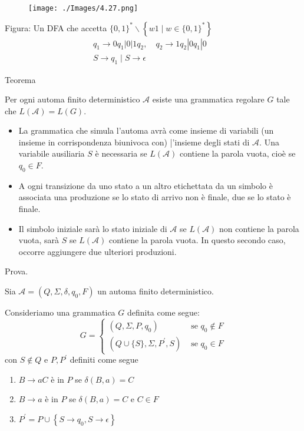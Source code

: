 \begin{figure}[hbpt!]
    \centering
    \texttt{[image: ./Images/4.27.png]}
\end{figure}
\FloatBarrier

Figura: Un DFA che accetta $\{0,1\}^{*} \backslash\left\{w 1 \mid w \in\{0,1\}^{*}\right\}$
$$
\begin{aligned}
q_{1} \rightarrow 0 q_{1}|0| 1 q_{2}, \quad q_{2} \rightarrow 1 q_{2}\left|0 q_{1}\right| 0 & \\
S \rightarrow q_{1} \mid S \rightarrow \epsilon &
\end{aligned}
$$

Teorema

Per ogni automa finito deterministico $\mathcal{A}$ esiste una grammatica regolare $G$ tale che $L(\mathcal{A})=L(G)$.
\begin{itemize}
    \item  La grammatica che simula l'automa avrà come insieme di variabili (un insieme in corrispondenza biunivoca con) |'insieme degli stati di $\mathcal{A}$. Una variabile ausiliaria $S$ è necessaria se $L(\mathcal{A})$ contiene la parola vuota, cioè se $q_{0} \in F$.
    \item A ogni transizione da uno stato a un altro etichettata da un simbolo è associata una produzione se lo stato di arrivo non è finale, due se lo stato è finale.
    \item Il simbolo iniziale sarà lo stato iniziale di $\mathcal{A}$ se $L(\mathcal{A})$ non contiene la parola vuota, sarà $S$ se $L(\mathcal{A})$ contiene la parola vuota. In questo secondo caso, occorre aggiungere due ulteriori produzioni.
\end{itemize}

Prova. 

Sia $\mathcal{A}=\left(Q, \Sigma, \delta, q_{0}, F\right)$ un automa finito deterministico.


Consideriamo una grammatica $G$ definita come segue:
$$
G= \begin{cases}\left(Q, \Sigma, P, q_{0}\right) & \text { se } q_{0} \notin F \\ \left(Q \cup\{S\}, \Sigma, P^{\prime}, S\right) & \text { se } q_{0} \in F\end{cases}
$$
con $S \notin Q$ e $P, P^{\prime}$ definiti come segue
\begin{enumerate}
    \item $B \rightarrow a C$ è in $P$ se $\delta(B, a)=C$
    \item $B \rightarrow a$ è in $P$ se $\delta(B, a)=C$ e $C \in F$
    \item $P^{\prime}=P \cup\left\{S \rightarrow q_{0}, S \rightarrow \epsilon\right\}$
\end{enumerate}

